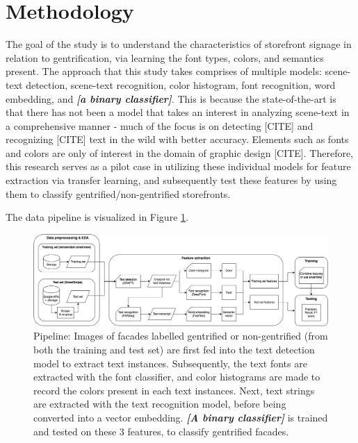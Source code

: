 \section{Methodology}
\label{sec:methodology}

The goal of the study is to understand the characteristics of storefront signage in relation to gentrification, via learning the font types, colors, and semantics present. The approach that this study takes comprises of multiple models: scene-text detection, scene-text recognition, color histogram, font recognition, word embedding, and \textbf{\textit{[a binary classifier]}}. This is because the state-of-the-art is that there has not been a model that takes an interest in analyzing scene-text in a comprehensive manner - much of the focus is on detecting [CITE] and recognizing [CITE] text in the wild with better accuracy. Elements such as fonts and colors are only of interest in the domain of graphic design [CITE]. Therefore, this research serves as a pilot case in utilizing these individual models for feature extraction via transfer learning, and subsequently test these features by using them to classify gentrified/non-gentrified storefronts.

The data pipeline is visualized in Figure \ref{fig:pipeline}.

\begin{figure}[h]
    \centering
    \includegraphics[width=\textwidth]{media/methodology/Pipeline.jpg}
    \caption{Pipeline: Images of facades labelled gentrified or non-gentrified (from both the training and test set) are first fed into the text detection model to extract text instances. Subsequently, the text fonts are extracted with the font classifier, and color histograms are made to record the colors present in each text instances. Next, text strings are extracted with the text recognition model, before being converted into a vector embedding. \textbf{\textit{[A binary classifier]}} is trained and tested on these 3 features, to classify gentrified facades.}
    \label{fig:pipeline}
\end{figure}

